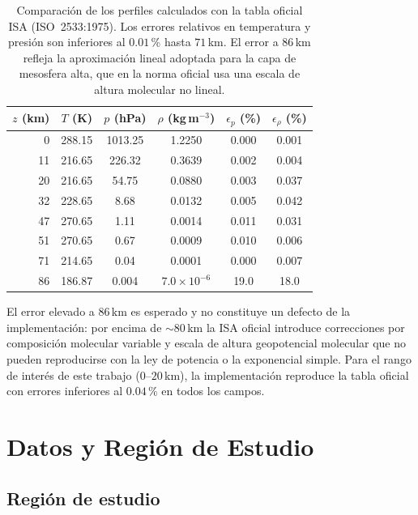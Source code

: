 \documentclass[12pt, a4paper]{article}
\begin{document}
\begin{table}[H]
	\centering
	\caption{Comparación de los perfiles calculados con la tabla
		oficial ISA (ISO~2533:1975). Los errores relativos
		en temperatura y presión son inferiores al $0.01$\,\%
		hasta $71$\,km. El error a $86$\,km refleja la
		aproximación lineal adoptada para la capa de mesosfera
		alta, que en la norma oficial usa una escala de altura
		molecular no lineal.}
	\label{tab:validacion_isa}
	\small
	\begin{tabular}{rccccc}
		\toprule
		$z$ (km) & $T$ (K) & $p$ (hPa) & $\rho$ (kg\,m$^{-3}$)
		& $\epsilon_p$ (\%) & $\epsilon_\rho$ (\%) \\
		\midrule
		0 & 288.15 & 1013.25 & 1.2250 & 0.000 & 0.001 \\
		11 & 216.65 &  226.32 & 0.3639 & 0.002 & 0.004 \\
		20 & 216.65 &   54.75 & 0.0880 & 0.003 & 0.037 \\
		32 & 228.65 &    8.68 & 0.0132 & 0.005 & 0.042 \\
		47 & 270.65 &    1.11 & 0.0014 & 0.011 & 0.031 \\
		51 & 270.65 &    0.67 & 0.0009 & 0.010 & 0.006 \\
		71 & 214.65 &    0.04 & 0.0001 & 0.000 & 0.007 \\
		86 & 186.87 &    0.004 & $7.0\times10^{-6}$ & 19.0 & 18.0 \\
		\bottomrule
	\end{tabular}
\end{table}

El error elevado a $86$\,km es esperado y no constituye un defecto de
la implementación: por encima de $\sim\!80$\,km la ISA oficial
introduce correcciones por composición molecular variable y escala de
altura geopotencial molecular que no pueden reproducirse con la ley de
potencia o la exponencial simple. Para el rango de interés de este
trabajo ($0$--$20$\,km), la implementación reproduce la tabla oficial
con errores inferiores al $0.04$\,\% en todos los campos.


\section{Datos y Región de Estudio}
\label{sec:datos}

\subsection{Región de estudio}
\end{document}
